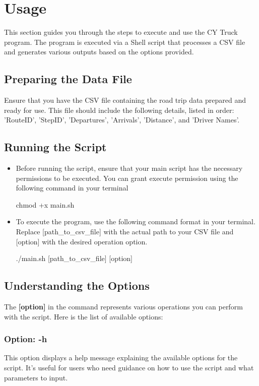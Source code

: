 \documentclass[11pt]{article}
\begin{document}
\section{Usage}
This section guides you through the steps to execute and use the CY Truck program. The program is executed via a Shell script that processes a CSV file and generates various outputs based on the options provided.

\subsection{Preparing the Data File}
Ensure that you have the CSV file containing the road trip data prepared and ready for use. This file should include the following details, listed in order: 'RouteID', 'StepID', 'Departures', 'Arrivals', 'Distance', and 'Driver Names'.

\subsection{Running the Script}
\begin{itemize}
    \item Before running the script, ensure that your main script has the necessary permissions to be executed. You can grant execute permission using the following command in your terminal
          \begin{mycode}
              chmod +x main.sh
          \end{mycode}

    \item To execute the program, use the following command format in your terminal. Replace [path\_to\_csv\_file] with the actual path to your CSV file and [option] with the desired operation option.
          \begin{mycode}
              ./main.sh [path\_to\_csv\_file] [option]
          \end{mycode}
\end{itemize}

\newpage
\subsection{Understanding the Options}
The \textbf{\color{blue}[option]} in the command represents various operations you can perform with the script. Here is the list of available options:


\subsubsection*{Option: \color{blue}-h}
This option displays a help message explaining the available options for the script. It's useful for users who need guidance on how to use the script and what parameters to input.
\end{document}
